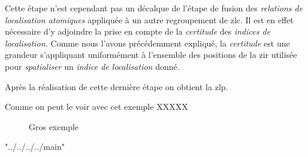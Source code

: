Cette étape n'est cependant pas un décalque de l'étape de fusion des
\emph{relations de localisation atomiques} appliquée à un autre
regroupement de \ac{zlc}. Il est en effet nécessaire d'y adjoindre la
prise en compte de la \emph{certitude} des \emph{indices de
  localisation.} Comme nous l'avons précédemment expliqué, la
\emph{certitude} est une grandeur s'appliquant uniformément à
l'ensemble des positions de la \ac{zir} utilisée pour
\emph{spatialiser} un \emph{indice de localisation} donné.

Après la réalisation de cette dernière étape on obtient la \ac{zlp}.

Comme on peut le voir avec cet exemple XXXXX

\begin{landscape}
  \begin{figure}[H] \centering
    
    \caption{Gros exemple}
    \label{fig:exemple_final_fusion}
  \end{figure}
\end{landscape}


"../../../../main" %
